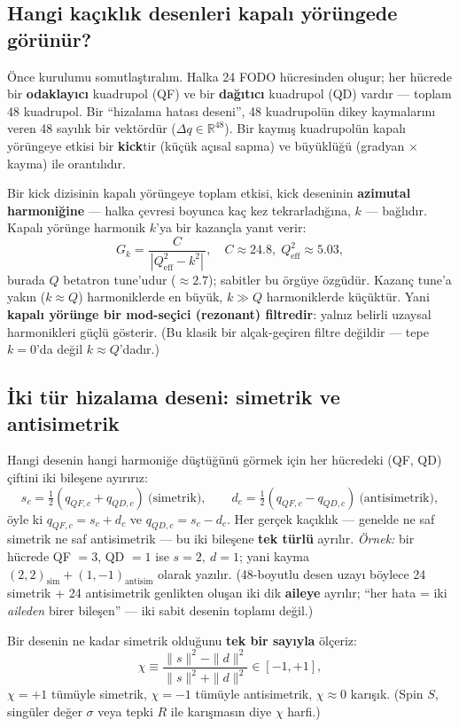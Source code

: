 \documentclass[twocolumn,a4paper,10pt]{article}
\begin{document}
\subsection{Hangi kaçıklık desenleri kapalı yörüngede görünür?}
Önce kurulumu somutlaştıralım. Halka 24 FODO hücresinden oluşur; her hücrede bir
\textbf{odaklayıcı} kuadrupol (QF) ve bir \textbf{dağıtıcı} kuadrupol (QD)
vardır --- toplam 48 kuadrupol. Bir ``hizalama hatası deseni'', 48 kuadrupolün
dikey kaymalarını veren 48 sayılık bir vektördür ($\Delta q\in\mathbb{R}^{48}$).
Bir kaymış kuadrupolün kapalı yörüngeye etkisi bir \textbf{kick}tir (küçük açısal
sapma) ve büyüklüğü (gradyan $\times$ kayma) ile orantılıdır.

Bir kick dizisinin kapalı yörüngeye toplam etkisi, kick deseninin \textbf{azimutal
harmoniğine} --- halka çevresi boyunca kaç kez tekrarladığına, $k$ --- bağlıdır.
Kapalı yörünge harmonik $k$'ya bir kazançla yanıt verir:
\begin{equation}
G_k = \frac{C}{\,|Q_\text{eff}^2-k^2|\,},\quad C\approx 24.8,\;
Q_\text{eff}^2\approx 5.03,
\label{eq:gain}
\end{equation}
burada $Q$ betatron tune'udur ($\approx 2.7$); sabitler bu örgüye özgüdür.
Kazanç tune'a yakın ($k\approx Q$) harmoniklerde en büyük, $k\gg Q$
harmoniklerde küçüktür. Yani \textbf{kapalı yörünge bir mod-seçici (rezonant)
filtredir}: yalnız belirli uzaysal harmonikleri güçlü gösterir. (Bu klasik bir
alçak-geçiren filtre değildir --- tepe $k=0$'da değil $k\approx Q$'dadır.)

\subsection{İki tür hizalama deseni: simetrik ve antisimetrik}
Hangi desenin hangi harmoniğe düştüğünü görmek için her hücredeki (QF, QD)
çiftini iki bileşene ayırırız:
$$
s_c = \tfrac12(q_{QF,c}+q_{QD,c})\ \text{(simetrik)},\qquad
d_c = \tfrac12(q_{QF,c}-q_{QD,c})\ \text{(antisimetrik)},
$$
öyle ki $q_{QF,c}=s_c+d_c$ ve $q_{QD,c}=s_c-d_c$. Her gerçek kaçıklık --- genelde
ne saf simetrik ne saf antisimetrik --- bu iki bileşene \textbf{tek türlü}
ayrılır. \emph{Örnek:} bir hücrede QF $=3$, QD $=1$ ise $s=2,\ d=1$; yani kayma
$(2,2)_{\text{sim}}+(1,-1)_{\text{antisim}}$ olarak yazılır. (48-boyutlu desen
uzayı böylece 24 simetrik + 24 antisimetrik genlikten oluşan iki dik
\textbf{aileye} ayrılır; ``her hata = iki \emph{aileden} birer bileşen'' ---
iki sabit desenin toplamı değil.)

Bir desenin ne kadar simetrik olduğunu \textbf{tek bir sayıyla} ölçeriz:
$$
\chi \equiv \frac{\|s\|^2-\|d\|^2}{\|s\|^2+\|d\|^2}\in[-1,+1],
$$
$\chi=+1$ tümüyle simetrik, $\chi=-1$ tümüyle antisimetrik, $\chi\approx0$
karışık. (Spin $S$, singüler değer $\sigma$ veya tepki $R$ ile karışmasın diye
$\chi$ harfi.)
\end{document}
